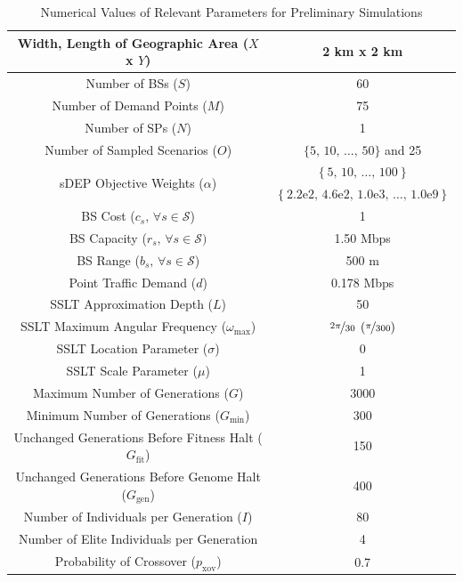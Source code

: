 \documentclass[12pt,dvipsnames]{report}
\newcommand{\expnumber}[2]{{#1}\mathrm{e}{#2}}
\begin{document}
\begin{table}[p]
	\centering
	\caption{Numerical Values of Relevant Parameters for Preliminary Simulations}
	\begin{tabular}{|c|c|} 
		\hline
		Width, Length of Geographic Area ($X$ x $Y$) & 2 km x 2 km \\
		\hline
		Number of BSs ($S$) & 60 \\ 
		\hline 
		Number of Demand Points ($M$) & 75 \\ 
		\hline 
		Number of SPs ($N$) & 1 \\
		\hline
		Number of Sampled Scenarios ($O$) & $\{5,\, 10,\, \ldots,\, 50\}$ and 25 \\ 
		\hline 
		\multirow{2}{*}{sDEP Objective Weights ($\alpha$)} & $\left\{ 5,\, 10,\, \ldots,\, 100 \right\}$ \\
		& $\left\{ \expnumber{2.2}{2},\, \expnumber{4.6}{2},\, \expnumber{1.0}{3},\, \ldots,\, \expnumber{1.0}{9} \right\}$ \\
		\hline
		BS Cost ($c_s,\, \forall s \in \mathcal{S}$) & 1 \\ 
		\hline 
		BS Capacity ($r_s,\, \forall s \in \mathcal{S})$ & 1.50 Mbps \\ 
		\hline
		BS Range ($b_s,\, \forall s \in \mathcal{S}$) & 500 m \\
		\hline 
		Point Traffic Demand ($d$) & 0.178 Mbps \\ 
		\hline 
		\hline
		SSLT Approximation Depth ($L$) & 50 \\ 
		\hline
		SSLT Maximum Angular Frequency ($\omega_{\max}$) & $\nicefrac{2 \pi}{30} \; \left( \nicefrac{\pi}{300} \right)$ \\
		\hline 
		SSLT Location Parameter ($\sigma$) & 0 \\ 
		\hline 
		SSLT Scale Parameter ($\mu$) & 1 \\ 
		\hline 
		\hline
		Maximum Number of Generations ($G$) & 3000 \\ 
		\hline
		Minimum Number of Generations ($G_{\min}$) & 300 \\
		\hline
		Unchanged Generations Before Fitness Halt ($G_{\text{fit}}$) & 150 \\
		\hline 
		Unchanged Generations Before Genome Halt ($G_{\text{gen}}$) & 400 \\
		\hline 
		Number of Individuals per Generation ($I$) & 80 \\ 
		\hline
		Number of Elite Individuals per Generation & 4 \\
		\hline 
		Probability of Crossover ($p_\text{xov}$) & 0.7 \\ 

\end{tabular}
\end{table}
\end{document}
